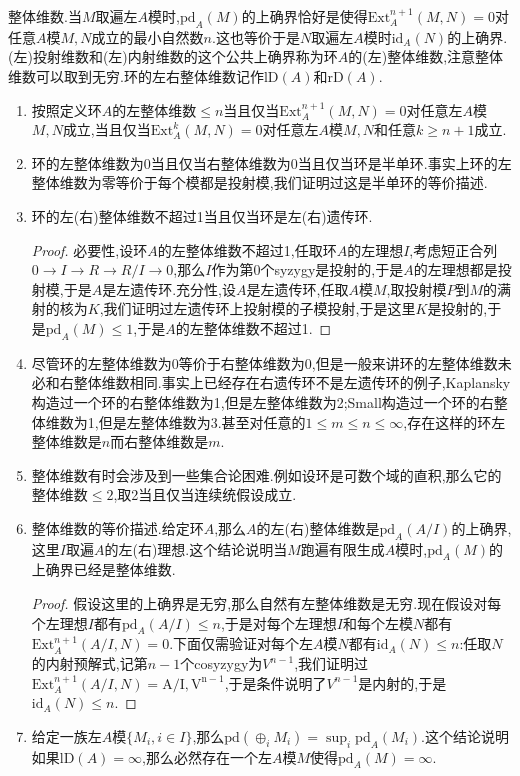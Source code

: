 整体维数.当$M$取遍左$A$模时,$\mathrm{pd}_A(M)$的上确界恰好是使得$\mathrm{Ext}_A^{n+1}(M,N)=0$对任意$A$模$M,N$成立的最小自然数$n$.这也等价于是$N$取遍左$A$模时$\mathrm{id}_A(N)$的上确界.(左)投射维数和(左)内射维数的这个公共上确界称为环$A$的(左)整体维数,注意整体维数可以取到无穷.环的左右整体维数记作$\mathrm{lD}(A)$和$\mathrm{rD}(A)$.
\begin{enumerate}
	\item 按照定义环$A$的左整体维数$\le n$当且仅当$\mathrm{Ext}_A^{n+1}(M,N)=0$对任意左$A$模$M,N$成立,当且仅当$\mathrm{Ext}_A^k(M,N)=0$对任意左$A$模$M,N$和任意$k\ge n+1$成立.
	\item 环的左整体维数为0当且仅当右整体维数为0当且仅当环是半单环.事实上环的左整体维数为零等价于每个模都是投射模,我们证明过这是半单环的等价描述.
	\item 环的左(右)整体维数不超过1当且仅当环是左(右)遗传环.
	\begin{proof}
		
		必要性,设环$A$的左整体维数不超过1,任取环$A$的左理想$I$,考虑短正合列$0\to I\to R\to R/I\to0$,那么$I$作为第0个syzygy是投射的,于是$A$的左理想都是投射模,于是$A$是左遗传环.充分性,设$A$是左遗传环,任取$A$模$M$,取投射模$P$到$M$的满射的核为$K$,我们证明过左遗传环上投射模的子模投射,于是这里$K$是投射的,于是$\mathrm{pd}_A(M)\le1$,于是$A$的左整体维数不超过1.
	\end{proof}
	\item 尽管环的左整体维数为0等价于右整体维数为0,但是一般来讲环的左整体维数未必和右整体维数相同.事实上已经存在右遗传环不是左遗传环的例子,Kaplansky构造过一个环的右整体维数为1,但是左整体维数为2;Small构造过一个环的右整体维数为1,但是左整体维数为3.甚至对任意的$1\le m\le n\le\infty$,存在这样的环左整体维数是$n$而右整体维数是$m$.
	\item 整体维数有时会涉及到一些集合论困难.例如设环是可数个域的直积,那么它的整体维数$\le2$,取2当且仅当连续统假设成立.
	\item 整体维数的等价描述.给定环$A$,那么$A$的左(右)整体维数是$\mathrm{pd}_A(A/I)$的上确界,这里$I$取遍$A$的左(右)理想.这个结论说明当$M$跑遍有限生成$A$模时,$\mathrm{pd}_A(M)$的上确界已经是整体维数.
	\begin{proof}
		
		假设这里的上确界是无穷,那么自然有左整体维数是无穷.现在假设对每个左理想$I$都有$\mathrm{pd}_A(A/I)\le n$,于是对每个左理想$I$和每个左模$N$都有$\mathrm{Ext}_A^{n+1}(A/I,N)=0$.下面仅需验证对每个左$A$模$N$都有$\mathrm{id}_A(N)\le n$:任取$N$的内射预解式,记第$n-1$个cosyzygy为$V^{n-1}$,我们证明过$\mathrm{Ext}_A^{n+1}(A/I,N)=\mathrm{A/I,V^{n-1}}$,于是条件说明了$V^{n-1}$是内射的,于是$\mathrm{id}_A(N)\le n$.
	\end{proof}
    \item 给定一族左$A$模$\{M_i,i\in I\}$,那么$\mathrm{pd}(\oplus_iM_i)=\sup_i\mathrm{pd}_A(M_i)$.这个结论说明如果$\mathrm{lD}(A)=\infty$,那么必然存在一个左$A$模$M$使得$\mathrm{pd}_A(M)=\infty$.
\end{enumerate}

